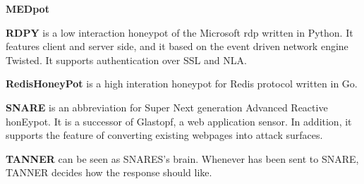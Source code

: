 \textbf{MEDpot} \cite{medpot2021}

\textbf{RDPY} \cite{rdpy2021} is a low interaction honeypot of the Microsoft \ac{rdp} written in Python.
It features client and server side, and it based on the event driven network engine Twisted.
It supports authentication over SSL and NLA.

\textbf{RedisHoneyPot} is a high interation honeypot for Redis protocol written in Go.

\textbf{SNARE} \cite{snare2021} is an abbreviation for Super Next generation Advanced Reactive honEypot.
It is a successor of Glastopf, a web application sensor.
In addition, it supports the feature of converting existing webpages into attack surfaces.

\textbf{TANNER} \cite{tanner2021} can be seen as SNARES's brain.
Whenever has been sent to SNARE, TANNER decides how the response should like.

